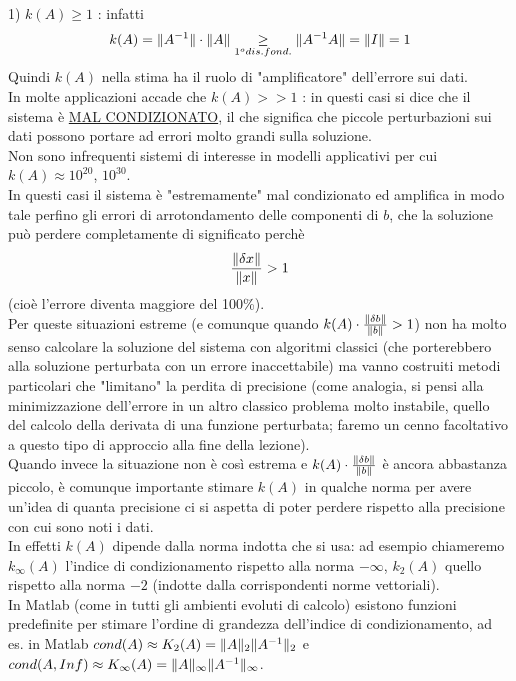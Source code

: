 \documentclass[12pt,a4paper]{article}
\DeclarePairedDelimiter{\norma}{\lVert}{\rVert}
\begin{document}
1) $k(A)\geq1$ : infatti
\begin{equation*}
    k(A)=\norma{A^{-1}}\cdot\norma{A}\underset{1^o dis. fond.}{\geq}\norma{A^{-1}A}=\norma{I}=1
\end{equation*}
Quindi $k(A)$ nella stima ha il ruolo di "amplificatore" dell'errore sui dati.\\ In molte applicazioni accade che $k(A)>>1$ : in questi casi si dice che il sistema è \underline{MAL CONDIZIONATO}, il che significa che piccole perturbazioni sui dati possono portare ad errori molto grandi sulla soluzione.\\
Non sono infrequenti sistemi di interesse in modelli applicativi per cui $k(A)\approx10^{20}$, $10^{30}$.\\In questi casi il sistema è "estremamente" mal condizionato ed amplifica in modo tale perfino gli errori di arrotondamento delle componenti di $b$, che la soluzione può perdere completamente di significato perchè
\begin{equation*}
    \frac{\norma{\delta x}}{\norma{x}}>1
\end{equation*}
(cioè l'errore diventa maggiore del 100\%).\\Per queste situazioni estreme (e comunque quando $k(A)\cdot\frac{\norma{\delta b}}{\norma{b}}>1$) non ha molto senso calcolare la soluzione del sistema con algoritmi classici (che porterebbero alla soluzione perturbata con un errore inaccettabile) ma vanno costruiti metodi particolari che "limitano" la perdita di precisione (come analogia, si pensi alla minimizzazione dell'errore in un altro classico problema molto instabile, quello del calcolo della derivata di una funzione perturbata; faremo un cenno facoltativo a questo tipo di approccio alla fine della lezione).\\Quando invece la situazione non è così estrema e $k(A)\cdot\frac{\norma{\delta b}}{\norma{b}}$ è ancora abbastanza piccolo, è comunque importante stimare $k(A)$ in qualche norma per avere un'idea di quanta precisione ci si aspetta di poter perdere rispetto alla precisione con cui sono noti i dati.\\In effetti $k(A)$ dipende dalla norma indotta che si usa: ad esempio chiameremo $k_\infty(A)$ l'indice di condizionamento rispetto alla norma $-\infty$, $k_2(A)$ quello rispetto alla norma $-2$ (indotte dalla corrispondenti norme vettoriali).\\In Matlab (come in tutti gli ambienti evoluti di calcolo) esistono funzioni predefinite per stimare l'ordine di grandezza dell'indice di condizionamento, ad es. in Matlab $cond(A) \approx K_2(A) = \norma{A}_2 \norma{A^{-1}}_2$ e $cond(A,Inf) \approx K_\infty(A) = \norma{A}_\infty \norma{A^{-1}}_\infty$.\\
\end{document}
